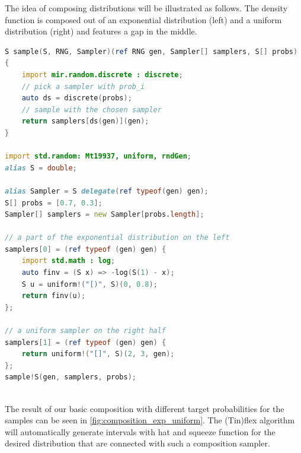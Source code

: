 The idea of composing distributions will be illustrated as follows.
The density function is composed out of an exponential distribution (left) and a uniform distribution (right) and features a gap in the middle.

\pagebreak

\begin{lstlisting}[language=D]
S sample(S, RNG, Sampler)(ref RNG gen, Sampler[] samplers, S[] probs)
{
    import mir.random.discrete : discrete;
    // pick a sampler with prob_i
    auto ds = discrete(probs);
    // sample with the chosen sampler
    return samplers[ds(gen)](gen);
}

import std.random: Mt19937, uniform, rndGen;
alias S = double;

alias Sampler = S delegate(ref typeof(gen) gen);
S[] probs = [0.7, 0.3];
Sampler[] samplers = new Sampler[probs.length];

// a part of the exponential distribution on the left
samplers[0] = (ref typeof (gen) gen) {
    import std.math : log;
    auto finv = (S x) => -log(S(1) - x);
    S u = uniform!("[)", S)(0, 0.8);
    return finv(u);
};

// a uniform sampler on the right half
samplers[1] = (ref typeof (gen) gen) {
    return uniform!("[]", S)(2, 3, gen);
};
sample!S(gen, samplers, probs);
\end{lstlisting}

\ \\

The result of our basic composition with different target probabilities for the samples can be seen in \autoref{fig:composition_exp_uniform}. The (Tin)flex algorithm will automatically generate intervals with hat and squeeze function for the desired distribution that are connected with such a composition sampler.

